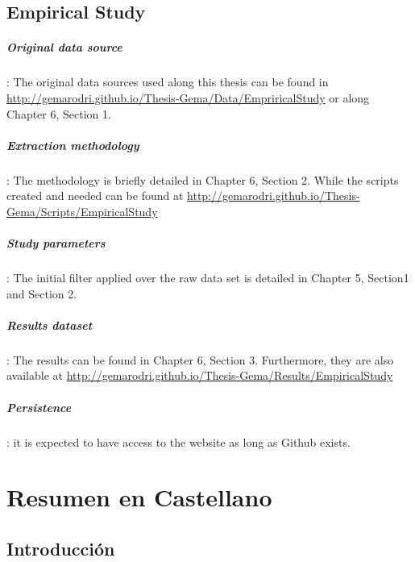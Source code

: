 \documentclass[a4paper, 12pt]{book}
\begin{document}
\section{Empirical Study}
\label{sec:replicabilityEmpirical}
\paragraph{Original data source}: The original data sources used along this thesis can be found in \url{http://gemarodri.github.io/Thesis-Gema/Data/EmpriricalStudy} or along Chapter 6, Section 1.
\paragraph{Extraction methodology}: The methodology is briefly detailed in Chapter 6, Section 2. While the scripts created and needed can be found at \url{http://gemarodri.github.io/Thesis-Gema/Scripts/EmpiricalStudy}
\paragraph{Study parameters}: The initial filter applied over the raw data set is detailed in Chapter 5, Section1 and Section 2. 
\paragraph{Results dataset}: The results can be found in Chapter 6, Section 3. Furthermore, they are also available at \url{http://gemarodri.github.io/Thesis-Gema/Results/EmpiricalStudy}
\paragraph{Persistence}:  it is expected to have access to the website as long as Github exists. 



\cleardoublepage
\chapter{Resumen en Castellano}
\label{app:resumen}
\section{Introducci\'on}
\end{document}
